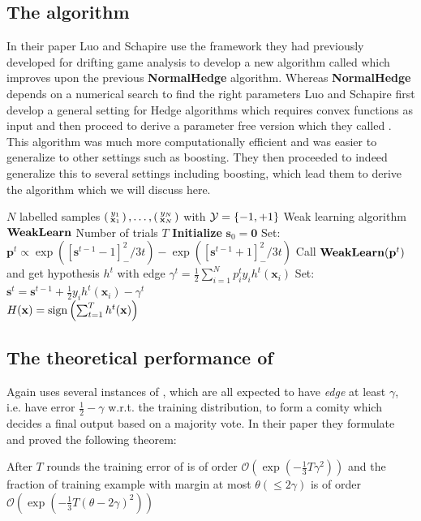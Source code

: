 \subsection{The algorithm}
\label{subsec:NHAlgo}
In their paper \cite{Luo2014} Luo and Schapire use the framework they had previously developed for drifting game analysis to develop a new algorithm called \adaN which improves upon the previous \textbf{NormalHedge} algorithm. Whereas \textbf{NormalHedge} depends on a numerical search to find the right parameters Luo and Schapire first develop a general setting for Hedge algorithms which requires convex functions as input and then proceed to derive a parameter free version which they called \adaN. This algorithm was much more computationally efficient and was easier to generalize to other settings such as boosting. They then proceeded to indeed generalize this to several settings including boosting, which lead them to derive the \NHB algorithm which we will discuss here. 
\begin{algorithm} 
\caption{\NHB}
\label{fig:adaNCode}
\begin{algorithmic}[1]
\Require 
\Statex $N$ labelled samples $\Vec{y_1\\ \mathbf x_1},\ldots,\Vec{y_N\\ \mathbf x_N}$  with $\mathcal Y = \set{-1,+1}$ 
\Statex Weak learning algorithm $\weak$
\Statex Number of trials $T$
\Procedure{\adaN}{}
\State \textbf{Initialize} $\mathbf{s}_0 = \mathbf 0$
\State Set: $\mathbf p^t \propto \exp([\mathbf s^{t-1}-1]_-^2/3t) - \exp([\mathbf s^{t-1}+1]_-^2/3t) $ 
\State Call $\weak(\mathbf p^t)$ and get hypothesis $h^t$ with edge $\gamma^t = \frac12\sum_{i=1}^Np^t_iy_ih^t(\mathbf x_i)$
\State Set: $\mathbf s^t = \mathbf s^{t-1} + \frac12 y_ih^t(\mathbf x_i)-\gamma^t$
\EndFor\\
\Return $H(\mathbf x) = \sign\lubke{\sum^T_{t=1}h^t(\mathbf{x})}$
\EndProcedure
\end{algorithmic}
\end{algorithm}

\subsection{The theoretical performance of \NHB}
\label{subsec:NHTheoPerf}
Again \NHB uses several instances of \weak, which are all expected to have \textit{edge} at least $\gamma$, i.e. have error $\frac12 - \gamma$ w.r.t. the training distribution, to form a comity which decides a final output based on a majority vote. In their paper they formulate and proved the following theorem: 
 \begin{theorem}\label{Thm:NHBPerf}\cite{Luo2014}
 After $T$ rounds the training error of \NHB is of order $\mathcal{O}(\exp(-\frac13T\gamma^2))$ and the fraction of training example with margin at most $\theta(\leq2\gamma)$ is of order $\mathcal{O}(\exp(-\frac13T(\theta-2\gamma)^2))$

 \end{theorem}

